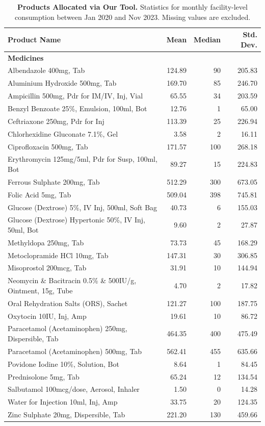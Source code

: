 \documentclass[12pt]{article}
\begin{document}
\begin{table}
\footnotesize
\centering
\caption{\textbf{Products Allocated via Our Tool.} Statistics for monthly facility-level consumption between Jan 2020 and Nov 2023. Missing values are excluded.}
\label{tab:medicine_consumption_treat1}
\begin{tabular}{p{8cm} r r r}
\toprule
\textbf{Product Name} & \textbf{Mean} & \textbf{Median} & \textbf{Std. Dev.} \\
\midrule

\multicolumn{4}{l}{\textbf{Medicines}\hfill} \\
\midrule
Albendazole 400mg, Tab & 124.89 & 90 & 205.83 \\
Aluminium Hydroxide 500mg, Tab & 169.70 & 85 & 246.70 \\
Ampicillin 500mg, Pdr for IM/IV, Inj, Vial & 65.55 & 34 & 203.59 \\
Benzyl Benzoate 25\%, Emulsion, 100ml, Bot & 12.76 & 1 & 65.00 \\
Ceftriaxone 250mg, Pdr for Inj & 113.39 & 25 & 226.94 \\
Chlorhexidine Gluconate 7.1\%, Gel & 3.58 & 2 & 16.11 \\
Ciprofloxacin 500mg, Tab & 171.57 & 100 & 268.18 \\
Erythromycin 125mg/5ml, Pdr for Susp, 100ml, Bot & 89.27 & 15 & 224.83 \\
Ferrous Sulphate 200mg, Tab & 512.29 & 300 & 673.05 \\
Folic Acid 5mg, Tab & 509.04 & 398 & 745.81 \\
Glucose (Dextrose) 5\%, IV Inj, 500ml, Soft Bag & 40.73 & 6 & 155.03 \\
Glucose (Dextrose) Hypertonic 50\%, IV Inj, 50ml, Bot & 9.60 & 2 & 27.87 \\
Methyldopa 250mg, Tab & 73.73 & 45 & 168.29 \\
Metoclopramide HCl 10mg, Tab & 147.31 & 30 & 306.85 \\
Misoprostol 200mcg, Tab & 31.91 & 10 & 144.94 \\
Neomycin \& Bacitracin 0.5\% \& 500IU/g, Ointment, 15g, Tube & 4.70 & 2 & 17.82 \\
Oral Rehydration Salts (ORS), Sachet & 121.27 & 100 & 187.75 \\
Oxytocin 10IU, Inj, Amp & 19.61 & 10 & 86.72 \\
Paracetamol (Acetaminophen) 250mg, Dispersible, Tab & 464.35 & 400 & 475.49 \\
Paracetamol (Acetaminophen) 500mg, Tab & 562.41 & 455 & 635.66 \\
Povidone Iodine 10\%, Solution, Bot & 8.64 & 1 & 84.45 \\
Prednisolone 5mg, Tab & 65.24 & 12 & 134.54 \\
Salbutamol 100mcg/dose, Aerosol, Inhaler & 1.50 & 0 & 14.28 \\
Water for Injection 10ml, Inj, Amp & 33.75 & 20 & 124.35 \\
Zinc Sulphate 20mg, Dispersible, Tab & 221.20 & 130 & 459.66 \\


\end{tabular}
\end{table}
\end{document}
